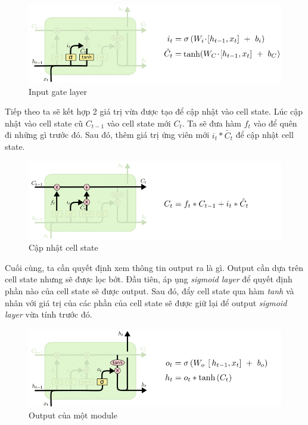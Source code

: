 \documentclass[a4paper,12pt]{report}
\begin{document}
\begin{figure}[H]
\centering
\includegraphics[scale=0.5]{lstm_module_secondstep.png}
\caption{Input gate layer}
\end{figure} 
\par Tiếp theo ta sẽ kết hợp 2 giá trị vừa được tạo để cập nhật vào cell state. Lúc cập nhật vào cell state cũ $C_{t-1}$ vào cell state mới $C_t$. Ta sẽ đưa hàm $f_t$ vào để quên đi những gì trước đó. Sau đó, thêm giá trị ứng viên mới $i_t*\tilde{C_t}$ để cập nhật cell state.
\begin{figure}[H]
\centering
\includegraphics[scale=0.5]{lstm_module_update_cellstate.png}
\caption{Cập nhật cell state}
\end{figure}
\par Cuối cùng, ta cần quyết định xem thông tin output ra là gì. Output cần dựa trên cell state nhưng sẽ được lọc bớt. Đầu tiên, áp ụng \emph{sigmoid layer} để quyết định phần nào của cell state sẽ được output. Sau đó, đẩy cell state qua hàm \emph{tanh} và nhân với giá trị của các phần của cell state sẽ được giữ lại để output \emph{sigmoid layer} vừa tính trước đó.
\begin{figure}[H]
\centering
\includegraphics[scale=0.5]{lstm_module_output.png}
\caption{Output của một module}
\end{figure}
\end{document}
